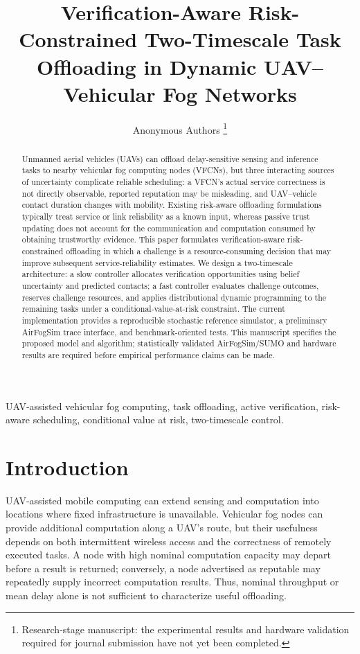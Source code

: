 \documentclass[journal]{IEEEtran}
\title{Verification-Aware Risk-Constrained Two-Timescale Task Offloading in Dynamic UAV--Vehicular Fog Networks}
\author{Anonymous Authors%
\thanks{Research-stage manuscript: the experimental results and hardware validation required for journal submission have not yet been completed.}}
\begin{document}
\maketitle
\begin{abstract}
Unmanned aerial vehicles (UAVs) can offload delay-sensitive sensing and inference tasks to nearby vehicular fog computing nodes (VFCNs), but three interacting sources of uncertainty complicate reliable scheduling: a VFCN's actual service correctness is not directly observable, reported reputation may be misleading, and UAV--vehicle contact duration changes with mobility. Existing risk-aware offloading formulations typically treat service or link reliability as a known input, whereas passive trust updating does not account for the communication and computation consumed by obtaining trustworthy evidence. This paper formulates verification-aware risk-constrained offloading in which a challenge is a resource-consuming decision that may improve subsequent service-reliability estimates. We design a two-timescale architecture: a slow controller allocates verification opportunities using belief uncertainty and predicted contacts; a fast controller evaluates challenge outcomes, reserves challenge resources, and applies distributional dynamic programming to the remaining tasks under a conditional-value-at-risk constraint. The current implementation provides a reproducible stochastic reference simulator, a preliminary AirFogSim trace interface, and benchmark-oriented tests. This manuscript specifies the proposed model and algorithm; statistically validated AirFogSim/SUMO and hardware results are required before empirical performance claims can be made.
\end{abstract}
\begin{IEEEkeywords}
UAV-assisted vehicular fog computing, task offloading, active verification, risk-aware scheduling, conditional value at risk, two-timescale control.
\end{IEEEkeywords}

\section{Introduction}
UAV-assisted mobile computing can extend sensing and computation into locations where fixed infrastructure is unavailable. Vehicular fog nodes can provide additional computation along a UAV's route, but their usefulness depends on both intermittent wireless access and the correctness of remotely executed tasks. A node with high nominal computation capacity may depart before a result is returned; conversely, a node advertised as reputable may repeatedly supply incorrect computation results. Thus, nominal throughput or mean delay alone is not sufficient to characterize useful offloading.
\end{document}
